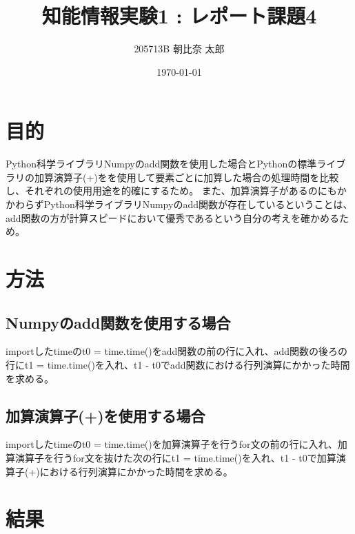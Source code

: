 \documentclass[a4paper, 11pt, titlepage]{jsarticle}
\title {知能情報実験1 : レポート課題4}
\author{205713B  朝比奈 太郎}
\date{\today }
\begin{document}
\maketitle
\tableofcontents
\clearpage

\section{目的}
Python科学ライブラリNumpyのadd関数を使用した場合とPythonの標準ライブラリの加算演算子(+)をを使用して要素ごとに加算した場合の処理時間を比較し、それぞれの使用用途を的確にするため。
また、加算演算子があるのにもかかわらずPython科学ライブラリNumpyのadd関数が存在しているということは、add関数の方が計算スピードにおいて優秀であるという自分の考えを確かめるため。
\section{方法}
\subsection{Numpyのadd関数を使用する場合}
importしたtimeのt0 = time.time()をadd関数の前の行に入れ、add関数の後ろの行にt1 = time.time()を入れ、t1 -  t0でadd関数における行列演算にかかった時間を求める。
\subsection{加算演算子(+)を使用する場合}
importしたtimeのt0 = time.time()を加算演算子を行うfor文の前の行に入れ、加算演算子を行うfor文を抜けた次の行にt1 = time.time()を入れ、t1 -  t0で加算演算子(+)における行列演算にかかった時間を求める。

\section{結果}
\end{document}
